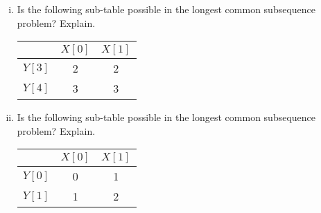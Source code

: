 \documentclass[11pt]{article}
\begin{document}
\begin{subparts}
\begin{enumerate}[(i)]
        \item Is the following sub-table possible in the longest common subsequence problem? Explain.

        \begin{center}
        \begin{tabular}{c|c|c|}
        \hline
        \hline
            & $X[0]$ & $X[1]$ \\
            \hline
            $Y[3]$ & 2 & 2 \\
            \hline
            $Y[4]$ & 3 & 3 \\
            \hline
            \hline
        \end{tabular}
        \end{center}
        
        \item Is the following sub-table possible in the longest common subsequence problem? Explain.

        \begin{center}
        \begin{tabular}{c|c|c}
        \hline
        \hline
            & $X[0]$ & $X[1]$ \\
            \hline
            $Y[0]$ & 0 & 1 \\
            \hline
            $Y[1]$ & 1 & 2 \\
            \hline
            \hline
        \end{tabular}
        \end{center}
        
    \end{enumerate}

    
\end{subparts}
\end{document}
